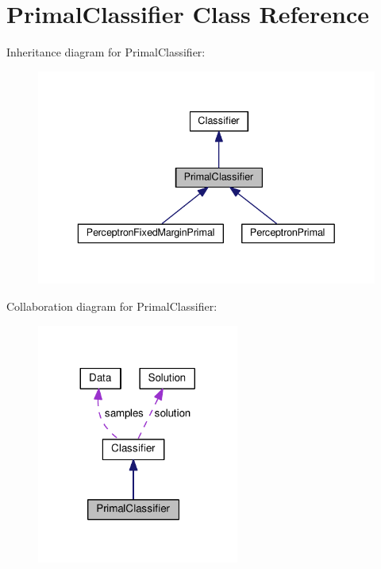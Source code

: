 \hypertarget{class_primal_classifier}{}\section{Primal\+Classifier Class Reference}
\label{class_primal_classifier}


Inheritance diagram for Primal\+Classifier\+:
\nopagebreak
\begin{figure}[H]
\begin{center}
\leavevmode
\includegraphics[width=336pt]{class_primal_classifier__inherit__graph}
\end{center}
\end{figure}


Collaboration diagram for Primal\+Classifier\+:
\nopagebreak
\begin{figure}[H]
\begin{center}
\leavevmode
\includegraphics[width=188pt]{class_primal_classifier__coll__graph}
\end{center}
\end{figure}
